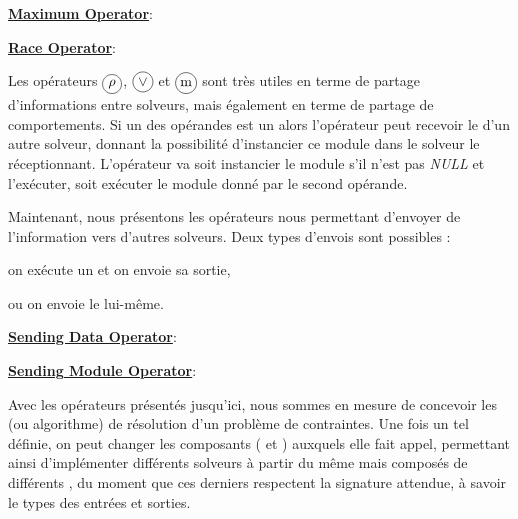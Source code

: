 \underline{\bf Maximum Operator}: 

\underline{\bf Race Operator}: 

Les opérateurs $\circled{$\rho$}$, $\circled{$\vee$}$ et $\circled{m}$ sont très  utiles en  terme de  partage d'informations entre   solveurs, mais également en terme de partage de comportements. Si un  des opérandes est un \opch{} alors l'opérateur peut recevoir le \om{} d'un autre solveur, donnant la possibilité d'instancier ce module dans le solveur le réceptionnant. L'opérateur va soit instancier le module s'il  n'est pas {\it NULL} et l'exécuter, soit exécuter le module donné par le second opérande.

Maintenant, nous présentons les opérateurs nous permettant d'envoyer de l'information vers d'autres solveurs. Deux types d'envois sont possibles :
\begin{inparaenum}[i)]
	\item on exécute un \m{} et on envoie sa sortie,
	\item ou on envoie le \m{} lui-même.
\end{inparaenum}

\underline{\bf Sending Data Operator}: 

\underline{\bf Sending Module Operator}: 

Avec  les opérateurs  présentés jusqu'ici, nous sommes  en mesure  de concevoir les \ass{} (ou algorithme) de résolution d'un problème de contraintes. Une fois un tel \as{} définie, on peut changer les composants (\oms{} et \opchs) auxquels elle fait appel, permettant ainsi d'implémenter différents solveurs à partir du même \as{} mais composés de différents \ms, du moment que ces derniers respectent la signature attendue, à savoir le types des entrées et sorties.

